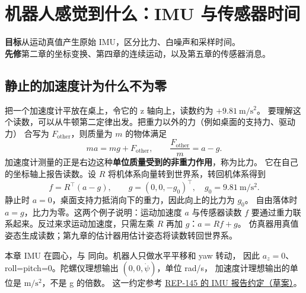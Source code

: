 \chapter{机器人感觉到什么：IMU 与传感器时间}\label{ch:imu}
\begin{notebox}
\textbf{目标}\quad 从运动真值产生原始 IMU，区分比力、白噪声和采样时间。\\
\textbf{先修}\quad 第二章的坐标变换、第四章的连续运动，以及第五章的传感器消息。
\end{notebox}

\section{静止的加速度计为什么不为零}
把一个加速度计平放在桌上，令它的 z 轴向上，读数约为 $+9.81\ \mathrm{m/s^2}$。
要理解这个读数，可以从牛顿第二定律出发。把重力以外的力（例如桌面的支持力、驱动力）
合写为 $F_{\mathrm{other}}$，则质量为 $m$ 的物体满足
\begin{equation}
ma=mg+F_{\mathrm{other}},\qquad
\frac{F_{\mathrm{other}}}{m}=a-g.
\end{equation}
加速度计测量的正是右边这种\textbf{单位质量受到的非重力作用}，称为比力。
它在自己的坐标轴上报告读数。设 $R$ 将机体系向量转到世界系，转回机体系得到
\begin{equation}
f=R^\top(a-g),\qquad g=(0,0,-g_0)^\top,\quad g_0=9.81\ \mathrm{m/s^2}.
\end{equation}
静止时 $a=0$，桌面支持力抵消向下的重力，因此向上的比力为 $g_0$。
自由落体时 $a=g$，比力为零。这两个例子说明：运动加速度 $a$ 与传感器读数 $f$
要通过重力联系起来。反过来求运动加速度，只需左乘 $R$ 再加 $g$：$a=Rf+g$。
仿真器用真值姿态生成读数；第九章的估计器用估计姿态将读数转回世界系。

\begin{center}
\end{center}

本章 IMU 在圆心，与  同向。机器人只做水平平移和 yaw 转动，
因此 $a_z=0$、roll=pitch=0。陀螺仪理想输出 $(0,0,\dot\psi)$，单位 rad/s，
加速度计理想输出的单位是 $\mathrm{m/s^2}$，不是 g 的倍数。
这一约定参考 \href{https://github.com/ros-infrastructure/rep/blob/master/rep-0145.rst}{REP-145 的 IMU 报告约定（草案）}。

